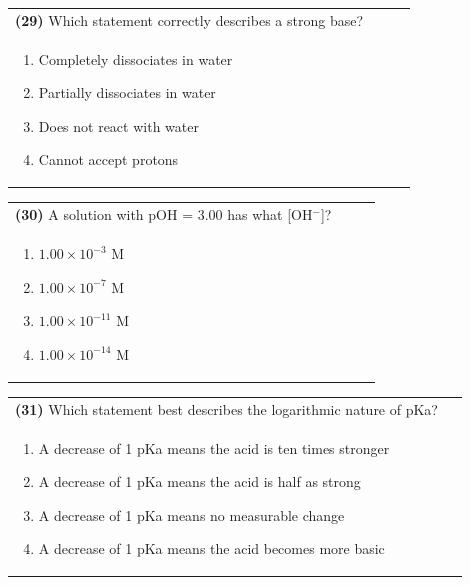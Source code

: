 \documentclass{article}
\begin{document}
\noindent\begin{tabular}{|p{0.9\linewidth}|}
\hline
\textbf{(29)} Which statement correctly describes a strong base? \\[0.2cm]
\begin{minipage}{0.85\linewidth}
\begin{enumerate}[label=\alph*.]
\item Completely dissociates in water \item Partially dissociates in water \item Does not react with water \item Cannot accept protons
\end{enumerate}
\end{minipage}\\[0.2cm]
\hline
\end{tabular}

\noindent\begin{tabular}{|p{0.9\linewidth}|}
\hline
\textbf{(30)} A solution with pOH = 3.00 has what [OH$^-$]? \\[0.2cm]
\begin{minipage}{0.85\linewidth}
\begin{enumerate}[label=\alph*.]
\item $1.00\times10^{-3}$ M \item $1.00\times10^{-7}$ M \item $1.00\times10^{-11}$ M \item $1.00\times10^{-14}$ M
\end{enumerate}
\end{minipage}\\[0.2cm]
\hline
\end{tabular}

\noindent\begin{tabular}{|p{0.9\linewidth}|}
\hline
\textbf{(31)} Which statement best describes the logarithmic nature of pKa? \\[0.2cm]
\begin{minipage}{0.85\linewidth}
\begin{enumerate}[label=\alph*.]
\item A decrease of 1 pKa means the acid is ten times stronger
\item A decrease of 1 pKa means the acid is half as strong
\item A decrease of 1 pKa means no measurable change
\item A decrease of 1 pKa means the acid becomes more basic
\end{enumerate}
\end{minipage}\\[0.2cm]
\hline
\end{tabular}
\end{document}
